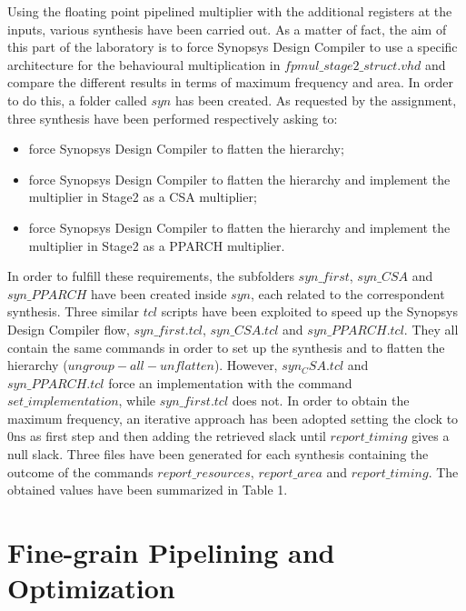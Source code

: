 Using the floating point pipelined multiplier with the additional registers at the inputs, various synthesis have been carried out. As a matter of fact, the aim of this part of the laboratory is to force Synopsys Design Compiler to use a specific architecture for the behavioural multiplication in $fpmul\_stage2\_struct.vhd$ and compare the different results in terms of maximum frequency and area.
In order to do this, a folder called $syn$ has been created. As requested by the assignment, three synthesis have been performed respectively asking to:

\begin{itemize}
\item force Synopsys Design Compiler to flatten the hierarchy;
\item force Synopsys Design Compiler to flatten the hierarchy and implement the multiplier in Stage2 as a CSA multiplier;
\item force Synopsys Design Compiler to flatten the hierarchy and implement the multiplier in Stage2 as a PPARCH multiplier.
\end{itemize}

\noindent In order to fulfill these requirements, the subfolders $syn\_first$, $syn\_CSA$ and $syn\_PPARCH$ have been created inside $syn$, each related to the correspondent synthesis. Three similar $tcl$ scripts have been exploited to speed up the Synopsys Design Compiler flow, $syn\_first.tcl$, $syn\_CSA.tcl$ and $syn\_PPARCH.tcl$. They all contain the same commands in order to set up the synthesis and to flatten the hierarchy ($ungroup  -all -unflatten$). However, $syn_CSA.tcl$ and $syn\_PPARCH.tcl$ force an implementation with the command $set\_implementation$, while $syn\_first.tcl$ does not.
In order to obtain the maximum frequency, an iterative approach has been adopted setting the clock to $0\si{\nano\second}$ as first step and then adding the retrieved slack until $report\_timing$ gives a null slack. Three files have been generated for each synthesis containing the outcome of the commands $report\_resources$, $report\_area$ and $report\_timing$. The obtained values have been summarized in Table 1.


\section{Fine-grain Pipelining and Optimization}

